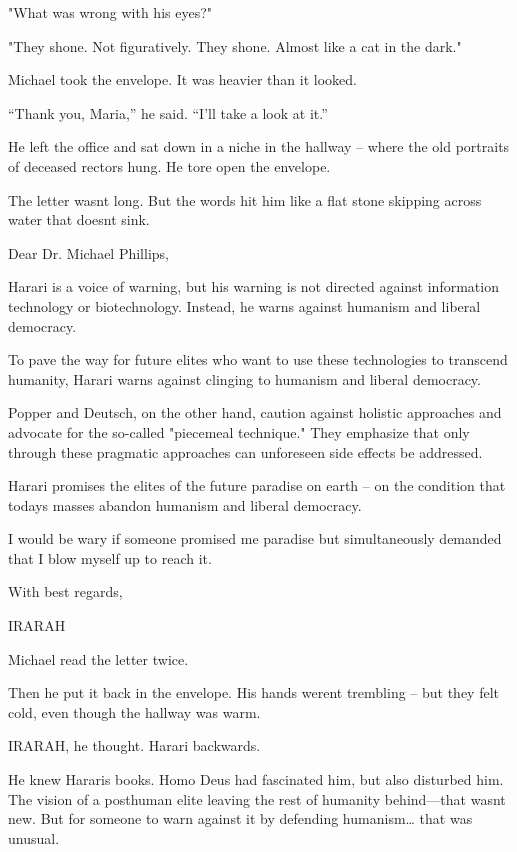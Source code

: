 \documentclass[
]{article}
\begin{document}
"What was wrong with his eyes?"

"They shone. Not figuratively. They shone. Almost like a cat in the dark."

Michael took the envelope. It was heavier than it looked.

``Thank you, Maria,'' he said. ``I'll take a look at it.''

He left the office and sat down in a niche in the hallway -- where the old portraits of deceased rectors hung. He tore open the envelope.

The letter wasn\textquotesingle t long. But the words hit him like a flat stone skipping across water that doesn\textquotesingle t sink.

Dear Dr. Michael Phillips,

Harari is a voice of warning, but his warning is not directed against information technology or biotechnology. Instead, he warns against humanism and liberal democracy.

To pave the way for future elites who want to use these technologies to transcend humanity, Harari warns against clinging to humanism and liberal democracy.

Popper and Deutsch, on the other hand, caution against holistic approaches and advocate for the so-called "piecemeal technique." They emphasize that only through these pragmatic approaches can unforeseen side effects be addressed.

Harari promises the elites of the future paradise on earth -- on the condition that today\textquotesingle s masses abandon humanism and liberal democracy.

I would be wary if someone promised me paradise but simultaneously demanded that I blow myself up to reach it.

With best regards,

IRARAH

Michael read the letter twice.

Then he put it back in the envelope. His hands weren\textquotesingle t trembling -- but they felt cold, even though the hallway was warm.

IRARAH, he thought. Harari backwards.

He knew Harari\textquotesingle s books. Homo Deus had fascinated him, but also disturbed him. The vision of a posthuman elite leaving the rest of humanity behind---that wasn\textquotesingle t new. But for someone to warn against it by defending humanism\ldots{} that was unusual.
\end{document}
